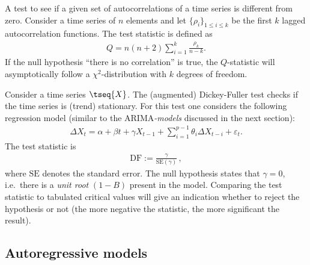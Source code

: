     \begin{method}
        A test to see if a given set of autocorrelations of a time series is different from zero. Consider a time series of $n$ elements and let $\{\rho_i\}_{1\leq i\leq k}$ be the first $k$ lagged autocorrelation functions. The test statistic is defined as
        \begin{gather}
            Q = n(n+2)\sum_{i=1}^k\frac{\rho_k}{n-k}.
        \end{gather}
        If the null hypothesis ``there is no correlation'' is true, the $Q$-statistic will asymptotically follow a $\chi^2$-distribution with $k$ degrees of freedom.
    \end{method}

    \begin{method}
        Consider a time series $\tseq{X}$. The (augmented) Dickey-Fuller test checks if the time series is (trend) stationary. For this test one considers the following regression model (similar to the ARIMA\textit{-models} discussed in the next section):
        \begin{gather}
            \Delta X_t = \alpha + \beta t + \gamma X_{t-1} + \sum_{i=1}^{p-1} \theta_i\Delta X_{t-i} + \varepsilon_t.
        \end{gather}
        The test statistic is
        \begin{gather}
            \mathrm{DF} := \frac{\gamma}{\mathrm{SE}(\gamma)}\,,
        \end{gather}
        where $\mathrm{SE}$ denotes the standard error. The null hypothesis states that $\gamma=0$, i.e.~there is a \textit{unit root} $(1-B)$ present in the model. Comparing the test statistic to tabulated critical values will give an indication whether to reject the hypothesis or not (the more negative the statistic, the more significant the result).
    \end{method}

\subsection{Autoregressive models}



